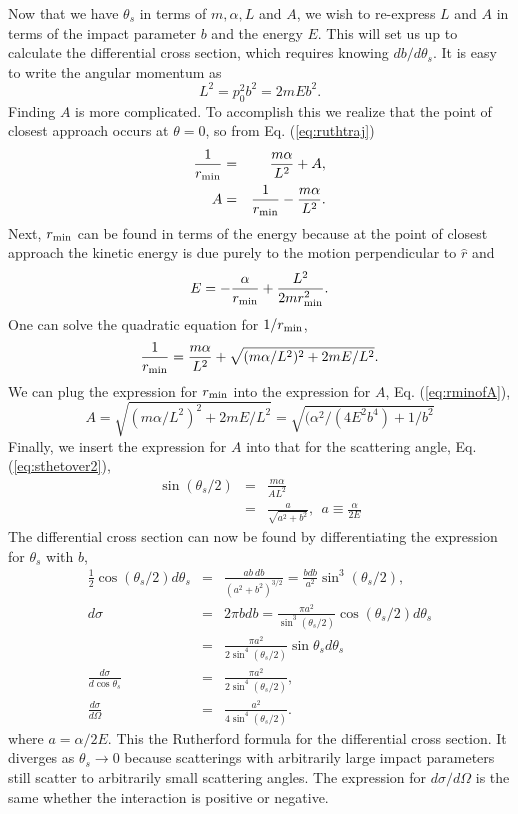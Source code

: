 Now that we have $\theta_s$ in terms of $m,\alpha,L$ and $A$, we wish to re-express $L$ and $A$ in terms of the impact parameter $b$ and the energy $E$. This will set us up to calculate the differential cross section, which requires knowing $db/d\theta_s$. It is easy to write the angular momentum as
\begin{equation}
L^2=p_0^2b^2=2mEb^2.
\end{equation}
Finding $A$ is more complicated. To accomplish this we realize that the point of closest approach occurs at $\theta=0$, so from Eq. (\ref{eq:ruthtraj})
\begin{eqnarray}
\label{eq:rminofA}
\frac{1}{r_{\rm min}}&=&\frac{m\alpha}{L^2}+A,\\
\nonumber
A&=&\frac{1}{r_{\rm min}}-\frac{m\alpha}{L^2}.
\end{eqnarray}
Next, $r_{\rm min}$ can be found in terms of the energy because at the point of closest approach the kinetic energy is due purely to the motion perpendicular to $\hat{r}$ and 
\begin{equation}
E=-\frac{\alpha}{r_{\rm min}}+\frac{L^2}{2mr_{\rm min}^2}.
\end{equation}
One can solve the quadratic equation for $1/r_{\rm min}$,
\begin{equation}
\frac{1}{r_{\rm min}}=\frac{m\alpha}{L^2}+\sqrt{(m\alpha/L^2)^2+2mE/L^2}.
\end{equation}
We can plug the expression for $r_{\rm min}$ into the expression for $A$, Eq. (\ref{eq:rminofA}),
\begin{equation}
A=\sqrt{(m\alpha/L^2)^2+2mE/L^2}=\sqrt{(\alpha^2/(4E^2b^4)+1/b^2}
\end{equation}
Finally, we insert the expression for $A$ into that for the scattering angle, Eq. (\ref{eq:sthetover2}),
\begin{eqnarray}
\label{eq:scattangle}
\sin(\theta_s/2)&=&\frac{m\alpha}{AL^2}\\
\nonumber
&=&\frac{a}{\sqrt{a^2+b^2}}, ~~a\equiv \frac{\alpha}{2E}
\end{eqnarray}
The differential cross section can now be found by differentiating the expression for $\theta_s$ with $b$,
\begin{eqnarray}
\label{eq:rutherford}
\frac{1}{2}\cos(\theta_s/2)d\theta_s&=&\frac{ab~db}{(a^2+b^2)^{3/2}}=\frac{bdb}{a^2}\sin^3(\theta_s/2),\\
\nonumber
d\sigma&=&2\pi bdb=\frac{\pi a^2}{\sin^3(\theta_s/2)}\cos(\theta_s/2)d\theta_s\\
\nonumber
&=&\frac{\pi a^2}{2\sin^4(\theta_s/2)}\sin\theta_s d\theta_s\\
\nonumber
\frac{d\sigma}{d\cos\theta_s}&=&\frac{\pi a^2}{2\sin^4(\theta_s/2)},\\
\nonumber
\frac{d\sigma}{d\Omega}&=&\frac{a^2}{4\sin^4(\theta_s/2)}.
\end{eqnarray}
where $a= \alpha/2E$. This the Rutherford formula for the differential cross section. It diverges as $\theta_s\rightarrow 0$ because scatterings with arbitrarily large impact parameters still scatter to arbitrarily small scattering angles. The expression for $d\sigma/d\Omega$ is the same whether the interaction is positive or negative. 

